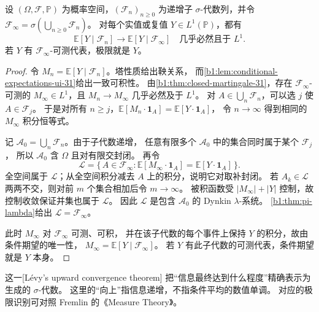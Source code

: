 \begin{theorem}
\label{b1:thm:levy-upward-31}
设 \((\Omega,\mathcal F,\mathbb P)\) 为概率空间，\((\mathcal F_n)_{n\geq0}\)
为递增子 \(\sigma\)-代数列，并令
\(\mathcal F_\infty=\sigma(\bigcup_{n\geq0}\mathcal F_n)\)。
对每个实值或复值 \(Y\in L^1(\mathbb P)\)，都有
\[
 \mathbb E[Y\mid\mathcal F_n]
 \longrightarrow\mathbb E[Y\mid\mathcal F_\infty]
 \quad\text{几乎必然且于 }L^1.
\]
若 \(Y\) 有 \(\mathcal F_\infty\)-可测代表，极限就是 \(Y\)。
\end{theorem}
\begin{proof}
令 \(M_n=\mathbb E[Y\mid\mathcal F_n]\)。塔性质给出鞅关系，
而\cref{b1:lem:conditional-expectations-ui-31}给出一致可积性。
由\cref{b1:thm:closed-martingale-31}，存在
\(\mathcal F_\infty\)-可测的 \(M_\infty\in L^1\)，且 \(M_n\to M_\infty\) 几乎必然及于 \(L^1\)。
对 \(A\in\bigcup_n\mathcal F_n\)，可以选 \(j\) 使 \(A\in\mathcal F_j\)。
于是对所有 \(n\geq j\)，\(\mathbb E[M_n\cdot\mathbf1_A]=\mathbb E[Y\cdot\mathbf1_A]\)，
令 \(n\to\infty\) 得到相同的 \(M_\infty\) 积分恒等式。

记 \(\mathcal A_0=\bigcup_n\mathcal F_n\)。由于子代数递增，
任意有限多个 \(\mathcal A_0\) 中的集合同时属于某个 \(\mathcal F_j\)，
所以 \(\mathcal A_0\) 含 \(\Omega\) 且对有限交封闭。
再令
\[
 \mathcal L=\{\,A\in\mathcal F_\infty:
       \mathbb E[M_\infty\cdot\mathbf1_A]=\mathbb E[Y\cdot\mathbf1_A]\,\}.
\]
全空间属于 \(\mathcal L\)；从全空间积分减去 \(A\) 上的积分，说明它对取补封闭。
若 \(A_k\in\mathcal L\) 两两不交，则对前 \(m\) 个集合相加后令 \(m\to\infty\)。
被积函数受 \(|M_\infty|+|Y|\) 控制，故控制收敛保证并集也属于 \(\mathcal L\)。
因此 \(\mathcal L\) 是包含 \(\mathcal A_0\) 的 Dynkin \(\lambda\)-系统。
\cref{b1:thm:pi-lambda}给出 \(\mathcal L=\mathcal F_\infty\)。

此时 \(M_\infty\) 对 \(\mathcal F_\infty\) 可测、可积，
并在该子代数的每个事件上保持 \(Y\) 的积分，故由条件期望的唯一性，
\(M_\infty=\mathbb E[Y\mid\mathcal F_\infty]\)。
若 \(Y\) 有此子代数的可测代表，条件期望就是 \(Y\) 本身。
\end{proof}

这一[Lévy's upward convergence theorem]
把“信息最终达到什么程度”精确表示为生成的 \(\sigma\)-代数。
这里的“向上”指信息递增，不指条件平均的数值单调。
对应的极限识别可对照 Fremlin 的《Measure Theory》\cite[275I]{Fremlin2016Measure}。

\ProseParagraphBreak


